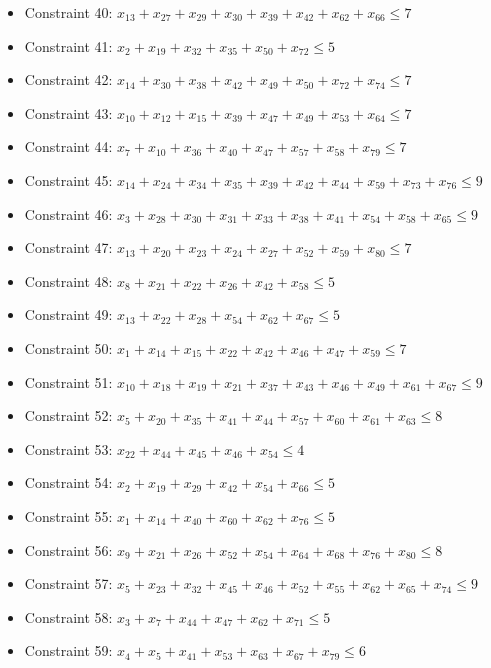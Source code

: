 \documentclass[11pt]{article}
\begin{document}
\begin{itemize}
\item Constraint 40: $x_{13} + x_{27} + x_{29} + x_{30} + x_{39} + x_{42} + x_{62} + x_{66} \le 7$
\item Constraint 41: $x_{2} + x_{19} + x_{32} + x_{35} + x_{50} + x_{72} \le 5$
\item Constraint 42: $x_{14} + x_{30} + x_{38} + x_{42} + x_{49} + x_{50} + x_{72} + x_{74} \le 7$
\item Constraint 43: $x_{10} + x_{12} + x_{15} + x_{39} + x_{47} + x_{49} + x_{53} + x_{64} \le 7$
\item Constraint 44: $x_{7} + x_{10} + x_{36} + x_{40} + x_{47} + x_{57} + x_{58} + x_{79} \le 7$
\item Constraint 45: $x_{14} + x_{24} + x_{34} + x_{35} + x_{39} + x_{42} + x_{44} + x_{59} + x_{73} + x_{76} \le 9$
\item Constraint 46: $x_{3} + x_{28} + x_{30} + x_{31} + x_{33} + x_{38} + x_{41} + x_{54} + x_{58} + x_{65} \le 9$
\item Constraint 47: $x_{13} + x_{20} + x_{23} + x_{24} + x_{27} + x_{52} + x_{59} + x_{80} \le 7$
\item Constraint 48: $x_{8} + x_{21} + x_{22} + x_{26} + x_{42} + x_{58} \le 5$
\item Constraint 49: $x_{13} + x_{22} + x_{28} + x_{54} + x_{62} + x_{67} \le 5$
\item Constraint 50: $x_{1} + x_{14} + x_{15} + x_{22} + x_{42} + x_{46} + x_{47} + x_{59} \le 7$
\item Constraint 51: $x_{10} + x_{18} + x_{19} + x_{21} + x_{37} + x_{43} + x_{46} + x_{49} + x_{61} + x_{67} \le 9$
\item Constraint 52: $x_{5} + x_{20} + x_{35} + x_{41} + x_{44} + x_{57} + x_{60} + x_{61} + x_{63} \le 8$
\item Constraint 53: $x_{22} + x_{44} + x_{45} + x_{46} + x_{54} \le 4$
\item Constraint 54: $x_{2} + x_{19} + x_{29} + x_{42} + x_{54} + x_{66} \le 5$
\item Constraint 55: $x_{1} + x_{14} + x_{40} + x_{60} + x_{62} + x_{76} \le 5$
\item Constraint 56: $x_{9} + x_{21} + x_{26} + x_{52} + x_{54} + x_{64} + x_{68} + x_{76} + x_{80} \le 8$
\item Constraint 57: $x_{5} + x_{23} + x_{32} + x_{45} + x_{46} + x_{52} + x_{55} + x_{62} + x_{65} + x_{74} \le 9$
\item Constraint 58: $x_{3} + x_{7} + x_{44} + x_{47} + x_{62} + x_{71} \le 5$
\item Constraint 59: $x_{4} + x_{5} + x_{41} + x_{53} + x_{63} + x_{67} + x_{79} \le 6$

\end{itemize}
\end{document}

